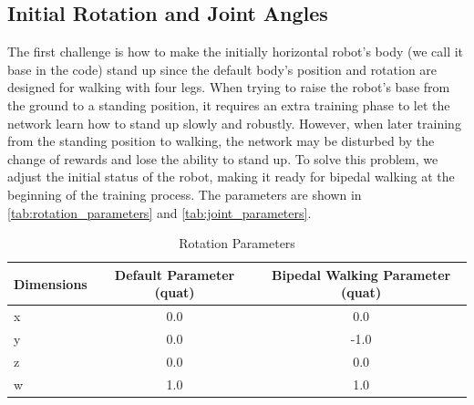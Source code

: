 \documentclass{article} %
\begin{document}
\subsection{Initial Rotation and Joint Angles}

The first challenge is how to make the initially horizontal robot's body (we call it base in the code) stand up since the default body's position and rotation are designed for walking with four legs. When trying to raise the robot's base from the ground to a standing position, it requires an extra training phase to let the network learn how to stand up slowly and robustly. However, when later training from the standing position to walking, the network may be disturbed by the change of rewards and lose the ability to stand up. To solve this problem, we adjust the initial status of the robot, making it ready for bipedal walking at the beginning of the training process. The parameters are shown in \autoref{tab:rotation_parameters} and \autoref{tab:joint_parameters}.

\begin{table}[h]
   \centering
   \begin{tabular}{@{}lcc@{}}
   \toprule
   Dimensions     & Default Parameter (quat) & Bipedal Walking Parameter (quat) \\ \midrule
   \midrule
   x     & 0.0          &  0.0     \\
   y     & 0.0          &  -1.0    \\
   z     & 0.0          &  0.0     \\
   w     & 1.0          &  1.0     \\
   \bottomrule
\end{tabular}
\vspace{-0.5em}
\caption{Rotation Parameters}
\label{tab:rotation_parameters}
\end{table}
\end{document}
